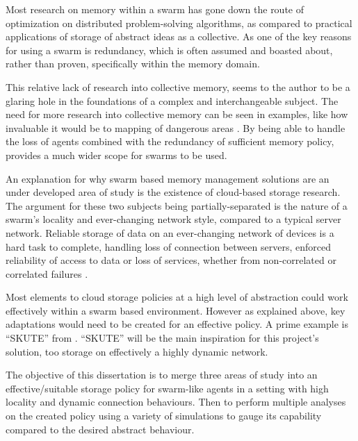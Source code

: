 \documentclass{UoYCSproject}
\begin{document}
Most research on memory within a swarm has gone down the route of optimization on distributed problem-solving algorithms, as compared to practical applications of storage of abstract ideas as a collective.
As one of the key reasons for using a swarm is redundancy, which is often assumed and boasted about, rather than proven, specifically within the memory domain.

This relative lack of research into collective memory, seems to the author to be a glaring hole in the foundations of a complex and interchangeable subject.
The need for more research into collective memory can be seen in examples, like how invaluable it would be to mapping of dangerous areas \cite{Cognitive maps mine detection}.
By being able to handle the loss of agents combined with the redundancy of sufficient memory policy, provides a much wider scope for swarms to be used.

An explanation for why swarm based memory management solutions are an under developed area of study is the existence of cloud-based storage research.
The argument for these two subjects being partially-separated is the nature of a swarm's locality and ever-changing network style, compared to a typical server network.
Reliable storage of data on an ever-changing network of devices is a hard task to complete, handling loss of connection between servers, enforced reliability of access to data or loss of services, whether from non-correlated or correlated failures \cite{Avalability storage}.

Most elements to cloud storage policies at a high level of abstraction could work effectively within a swarm based environment.
However as explained above, key adaptations would need to be created for an effective policy.
A prime example is “SKUTE” from \cite{Distributed Storage}.
“SKUTE” will be the main inspiration for this project's solution, too storage on effectively a highly dynamic network.

The objective of this dissertation is to merge three areas of study into an effective/suitable storage policy for swarm-like agents in a setting with high locality and dynamic connection behaviours.
Then to perform multiple analyses on the created policy using a variety of simulations to gauge its capability compared to the desired abstract behaviour.
\end{document}
